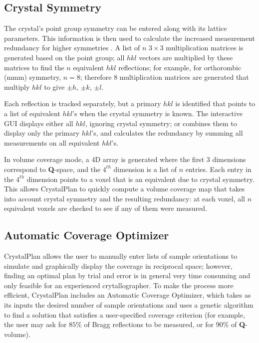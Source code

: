 \documentclass[final]{iucr}              %
\begin{document}
\subsection{Crystal Symmetry}
\label{sec:symm}
The crystal's point group symmetry can
be entered along with its lattice parameters.
This information is then used to
calculate the increased measurement redundancy for higher symmetries
\cite{giacovazzo92}. 
A list of $n$ $3\times3$ multiplication matrices is generated based on the point group; 
all $hkl$ vectors are multiplied by
these matrices to find the $n$ equivalent $hkl$ reflections; for example, for
orthorombic (mmm) symmetry, $n=8$; therefore 8 multiplication matrices are
generated that multiply $hkl$ to give $\pm h$, $\pm k$, $\pm l$.              

Each reflection is tracked separately, but a primary
$hkl$ is identified that points to a list of equivalent $hkl$'s when the
crystal symmetry is known.
The interactive GUI displays either all $hkl$, ignoring crystal symmetry; or
combines them to display only the primary $hkl$'s, and calculates the
redundancy by summing all measurements on all equivalent $hkl$'s.

In volume coverage mode, a 4D array is generated where the first 3 dimensions
correspond to {\bf Q}-space, and the $4^{th}$ dimension is a list of $n$
entries. Each entry in the $4^{th}$ dimension points to a voxel that is an
equivalent due to crystal symmetry. This allows CrystalPlan to quickly compute a volume coverage
map that takes into account crystal symmetry and the resulting redundancy: at
each voxel, all $n$ equivalent voxels are checked to see if any of them were
measured.



\subsection{Automatic Coverage Optimizer}

CrystalPlan allows the user to manually enter lists of sample orientations to
simulate and graphically display the coverage in reciprocal space;
however, finding an optimal plan by trial and error is in general very
time consuming and only feasible for an experienced crytallographer.
To make the process more efficient, CrystalPlan includes an Automatic
Coverage Optimizer, which takes as its inputs the desired number of sample
orientations and uses a genetic algorithm to find a solution that satisfies a
user-specified coverage criterion (for example, the user may ask for $85\%$ of 
Bragg reflections to be measured, or for $90\%$ of {\bf Q}-volume). 
\end{document}
